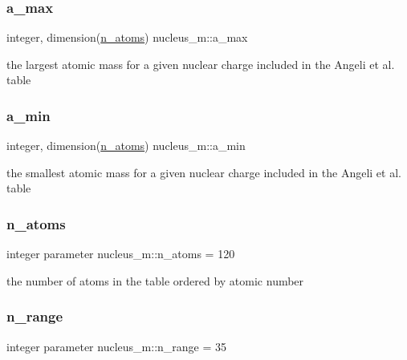 \subsubsection{\texorpdfstring{a\_max}{a\_max}}
{\footnotesize\ttfamily integer, dimension(\mbox{\hyperlink{namespacenucleus__m_a97ff520812e294bf26a6b2c330f211e5}{n\+\_\+atoms}}) nucleus\+\_\+m\+::a\+\_\+max}



the largest atomic mass for a given nuclear charge included in the Angeli et al. table 

\mbox{\label{namespacenucleus__m_a8541e730d34d4c5cbb0ca885c9c5cc35}} 
\subsubsection{\texorpdfstring{a\_min}{a\_min}}
{\footnotesize\ttfamily integer, dimension(\mbox{\hyperlink{namespacenucleus__m_a97ff520812e294bf26a6b2c330f211e5}{n\+\_\+atoms}}) nucleus\+\_\+m\+::a\+\_\+min}



the smallest atomic mass for a given nuclear charge included in the Angeli et al. table 

\mbox{\label{namespacenucleus__m_a97ff520812e294bf26a6b2c330f211e5}} 
\subsubsection{\texorpdfstring{n\_atoms}{n\_atoms}}
{\footnotesize\ttfamily integer parameter nucleus\+\_\+m\+::n\+\_\+atoms = 120}



the number of atoms in the table ordered by atomic number 

\mbox{\label{namespacenucleus__m_adf953c9196f6870fe5e502b4f40bea48}} 
\subsubsection{\texorpdfstring{n\_range}{n\_range}}
{\footnotesize\ttfamily integer parameter nucleus\+\_\+m\+::n\+\_\+range = 35}




